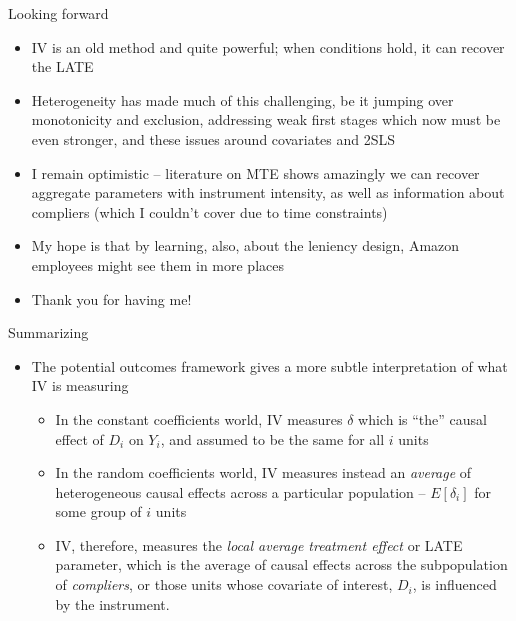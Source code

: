 \documentclass{beamer}
\begin{document}
\begin{frame}{Looking forward}
\begin{itemize}

\item IV is an old method and quite powerful; when conditions hold, it can recover the LATE
\item Heterogeneity has made much of this challenging, be it jumping over monotonicity and exclusion, addressing weak first stages which now must be even stronger, and these issues around covariates and 2SLS
\item I remain optimistic -- literature on MTE shows amazingly we can recover aggregate parameters with instrument intensity, as well as information about compliers (which I couldn't cover due to time constraints)
\item My hope is that by learning, also, about the leniency design, Amazon employees might see them in more places
\item Thank you for having me!

\end{itemize}

\end{frame}




\begin{frame}{Summarizing}

	\begin{itemize}
	\item The potential outcomes framework gives a more subtle interpretation of what IV is measuring
		\begin{itemize}
		\item In the constant coefficients world, IV measures $\delta$ which is ``the'' causal effect of $D_i$ on $Y_i$, and assumed to be the same for all $i$ units
		\item In the random coefficients world, IV measures instead an \emph{average} of heterogeneous causal effects across a particular population -- $E[\delta_i]$ for some group of $i$ units
	\item IV, therefore, measures the \emph{local average treatment effect} or LATE parameter, which is the average of causal effects across the subpopulation of \emph{compliers}, or those units whose covariate of interest, $D_i$, is influenced by the instrument. 
		\end{itemize}
	\end{itemize}

\end{frame}
\end{document}
